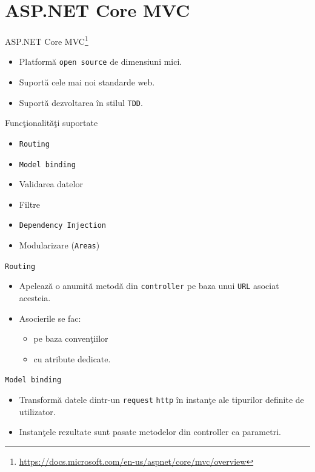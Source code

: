 \documentclass[presentation]{beamer}
\begin{document}
\section{ASP.NET Core MVC}
\label{sec:org52112b6}
\begin{frame}[label={sec:org9dc2255},fragile]{ASP.NET Core MVC\footnote{\url{https://docs.microsoft.com/en-us/aspnet/core/mvc/overview}}}
 \begin{itemize}
\item Platformă \texttt{open source} de dimensiuni mici.
\item Suportă cele mai noi standarde web.
\item Suportă dezvoltarea în stilul \texttt{TDD}.
\end{itemize}
\end{frame}
\begin{frame}[label={sec:orge268a70},fragile]{Funcţionalităţi suportate}
 \begin{itemize}
\item \texttt{Routing}
\item \texttt{Model binding}
\item Validarea datelor
\item Filtre
\item \texttt{Dependency Injection}
\item Modularizare (\texttt{Areas})
\end{itemize}
\end{frame}
\begin{frame}[label={sec:org12e9749},fragile]{\texttt{Routing}}
 \begin{itemize}
\item Apelează o anumită metodă din \texttt{controller} pe baza unui \texttt{URL} asociat acesteia.
\item Asocierile se fac:
\begin{itemize}
\item pe baza convenţiilor
\item cu atribute dedicate.
\end{itemize}
\end{itemize}
\end{frame}
\begin{frame}[label={sec:orge888305},fragile]{\texttt{Model binding}}
 \begin{itemize}
\item Transformă datele dintr-un \texttt{request} \texttt{http} în instanţe ale tipurilor definite de utilizator.
\item Instanţele rezultate sunt pasate metodelor din controller ca parametri.
\end{itemize}
\end{frame}
\end{document}
